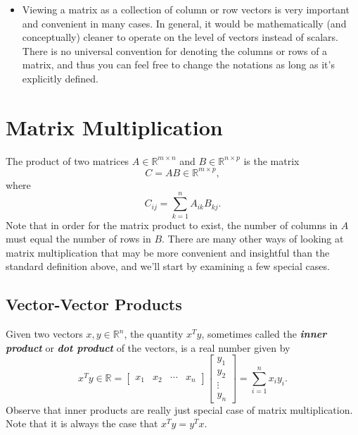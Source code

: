 \documentclass[12pt]{article}
\begin{document}
\begin{itemize}
\item Viewing a matrix as a collection of column or row vectors is very important and convenient in many cases. In general,  it would be mathematically (and conceptually) cleaner to operate on the level of vectors instead of scalars. There is no universal convention for denoting the columns or rows of a matrix, and thus you can feel free to change the notations as long as it's explicitly defined. %

\end{itemize}

\section{Matrix Multiplication}

The product of two matrices $A \in \mathbb{R}^{m \times n}$ and $B \in
\mathbb{R}^{n \times p}$ is the matrix \[C = AB \in \mathbb{R}^{m
  \times p},\] where \[C_{ij} = \sum_{k=1}^n A_{ik}B_{kj}.\]  Note
that in order for the matrix product to exist, the number of columns
in $A$ must equal the number of rows in $B$. There are
many other ways of looking at matrix multiplication that may be more convenient and insightful than the standard definition above, and we'll start by
examining a few special cases.

\subsection{Vector-Vector Products}

Given two vectors $x, y \in \mathbb{R}^n$, the quantity $x^T y$,
sometimes called the \textbf{\textit{inner product}} or
\textbf{\textit{dot product}} of
the vectors, is a real number given by
\[x^T y \in \mathbb{R} = 
\left [ \begin{array}{cccc} x_1 & x_2 & \cdots & x_n \end{array} \right ]
\left [ \begin{array}{c} y_1 \\ y_2 \\ \vdots \\ y_n \end{array} \right ]
= \sum_{i=1}^n x_i y_i.\]
Observe that inner products are really just special case of matrix multiplication.
Note that it is always the case that $x^T y = y^T x$.
\end{document}
